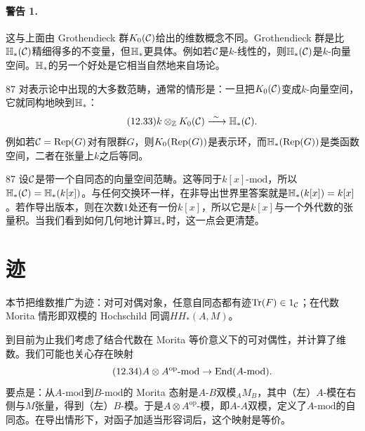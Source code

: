 \paragraph{警告 1.}
这与上面由 Grothendieck 群$K_0(\mathcal{C})$给出的维数概念不同。Grothendieck 群是比$\mathbb{H}_{*}(\mathcal{C})$精细得多的不变量，但$\mathbb{H}_{*}$更具体。例如若$\mathcal{C}$是$k$-线性的，则$\mathbb{H}_{*}(\mathcal{C})$是$k$-向量空间。$\mathbb{H}_{*}$的另一个好处是它相当自然地来自场论。

\begin{srcrem}{87}
对表示论中出现的大多数范畴，通常的情形是：一旦把$K_0(\mathcal{C})$变成$k$-向量空间，它就同构地映到$\mathbb{H}_{*}$：
\begin{equation}\tag{12.33}
k\otimes_{\mathbb{Z}}K_0(\mathcal{C})\xrightarrow{\ \sim\ }\mathbb{H}_{*}(\mathcal{C}).
\end{equation}
例如若$\mathcal{C}=\mathrm{Rep}(G)$对有限群$G$，则$K_0(\mathrm{Rep}(G))$是表示环，而$\mathbb{H}_{*}(\mathrm{Rep}(G))$是类函数空间，二者在张量上$k$之后等同。
\end{srcrem}

\begin{srcex}{87}
设$\mathcal{C}$是带一个自同态的向量空间范畴。这等同于$k[x]\text{-}\mathrm{mod}$，所以$\mathbb{H}_{*}(\mathcal{C})=\mathbb{H}_{*}(k[x])$。与任何交换环一样，在非导出世界里答案就是$\mathbb{H}_{*}(k[x])=k[x]$。若作导出版本，则在次数$1$处还有一份$k[x]$，所以它是$k[x]$与一个外代数的张量积。当我们看到如何几何地计算$\mathbb{H}_{*}$时，这一点会更清楚。
\end{srcex}


\section{迹}\label{sec:12-4}

\begin{sectionkey}
本节把维数推广为迹：对可对偶对象，任意自同态都有迹$\operatorname{Tr}(F)\in 1_{\mathcal{C}}$；在代数 Morita 情形即双模的 Hochschild 同调$HH_*(A,M)$。
\end{sectionkey}

到目前为止我们考虑了结合代数在 Morita 等价意义下的可对偶性，并计算了维数。我们可能也关心存在映射
\begin{equation}\tag{12.34}
A\otimes A^{\mathrm{op}}\text{-}\mathrm{mod}\to\mathrm{End}(A\text{-}\mathrm{mod}).
\end{equation}
要点是：从$A\text{-}\mathrm{mod}$到$B\text{-}\mathrm{mod}$的 Morita 态射是$A$-$B$双模${}_AM_B$，其中（左）$A$-模在右侧与$M$张量，得到（左）$B$-模。于是$A\otimes A^{\mathrm{op}}$-模，即$A$-$A$双模，定义了$A\text{-}\mathrm{mod}$的自同态。在导出情形下，对函子加适当形容词后，这个映射是等价。

